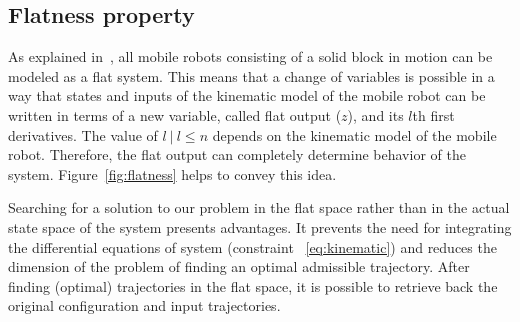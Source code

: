 %
%
%

\subsection{Flatness property}

As explained in~\cite{Defoort2007a}, all mobile robots consisting of a solid
block in motion can be modeled as a flat system. 
This means that a change of variables is possible in a way that states and
inputs of the kinematic model of the mobile robot can be written in terms
of a new variable, called flat output ($z$), and its $l$th first derivatives.
The value of $l\ |\ l \leq n$ depends on the kinematic model of the mobile robot.
Therefore, the flat output can completely determine behavior of the system.
Figure~\ref{fig:flatness} helps to convey this idea.

Searching for a solution to our problem in the flat space rather than in
the actual state space of the system presents advantages.
It prevents the need for integrating the differential equations
of system (constraint ~\ref{eq:kinematic}) and reduces the dimension of the 
problem of finding an optimal admissible trajectory.
After finding (optimal) trajectories in the flat space, it is possible
to retrieve back the original configuration and input trajectories.

